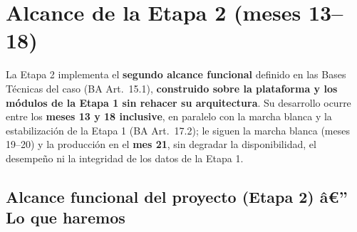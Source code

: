 \section{Alcance de la Etapa 2 (meses 13--18)}

La Etapa 2 implementa el \textbf{segundo alcance funcional} definido en las Bases Técnicas del caso (BA Art.\ 15.1), \textbf{construido sobre la plataforma y los módulos de la Etapa 1 sin rehacer su arquitectura}. Su desarrollo ocurre entre los \textbf{meses 13 y 18 inclusive}, en paralelo con la marcha blanca y la estabilización de la Etapa 1 (BA Art.\ 17.2); le siguen la marcha blanca (meses 19--20) y la producción en el \textbf{mes 21}, sin degradar la disponibilidad, el desempeño ni la integridad de los datos de la Etapa 1.

\subsection{Alcance funcional del proyecto (Etapa 2) â€” Lo que haremos}

